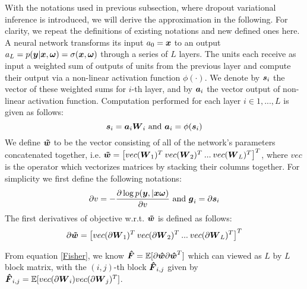 With the notations used in previous subsection, where dropout variational inference is introduced, we will derive the approximation in the following. For clarity, we repeat the definitions of existing notations and new defined ones here. A neural network transforms its input $a_0 = \boldsymbol x$ to an output $a_L=p(\boldsymbol y| \boldsymbol x, \boldsymbol \omega)=\sigma(\boldsymbol x, \boldsymbol \omega)$ through a series of $L$ layers. The units each receive as input a weighted sum of outputs of units from the previous layer and compute their output via a non-linear activation function $\phi(\cdot)$. We denote by $\boldsymbol s_i$ the vector of these weighted sums for $i$-th layer, and by $\boldsymbol a_i$ the vector output of non-linear activation function. Computation performed for each layer $i\in{1,...,L}$ is given as follows:
\begin{equation}
\boldsymbol s_i = \boldsymbol a_i\boldsymbol W_i \text{ and } \boldsymbol a_i = \phi(\boldsymbol s_i)
\end{equation}
We define $\boldsymbol{\tilde{w}}$ to be the vector consisting of all of the network's parameters concatenated together, i.e. $\boldsymbol{\tilde{w}}= \big[vec(\boldsymbol W_1)^T \: vec(\boldsymbol W_2)^T \: ...\:vec(\boldsymbol W_L)^T\big]^T$, where $vec$ is the operator which vectorizes matrices by stacking their columns together. 
For simplicity we first define the following notations:
\[
\partial v = -\frac{\partial \log{p(\boldsymbol y, | \boldsymbol x \boldsymbol\omega)}}{\partial v} \text{ and } \boldsymbol g_i = \partial \boldsymbol s_i
\]
The first derivatives of objective w.r.t. $\boldsymbol{\tilde{w}}$ is defined as follows:
\begin{equation}
\begin{aligned}
\partial \boldsymbol{\tilde{w}} = \big[vec(\partial \boldsymbol W_1)^T\: vec(\partial \boldsymbol W_2)^T\: ...\:vec(\partial \boldsymbol W_L)^T\big]^T
\end{aligned}
\end{equation}

From equation \ref{Fisher}, we know $\boldsymbol{\hat F} = \mathbb E[\partial \boldsymbol{\hat w}\partial \boldsymbol{\hat w}^T]$ which can viewed as $L$ by $L$ block matrix, with the $(i,j)$-th block $\boldsymbol{\hat F}_{i,j}$ given by $\boldsymbol{\hat F}_{i,j} = \mathbb E[vec(\partial\boldsymbol W_i)vec(\partial\boldsymbol W_j)^T]$.

